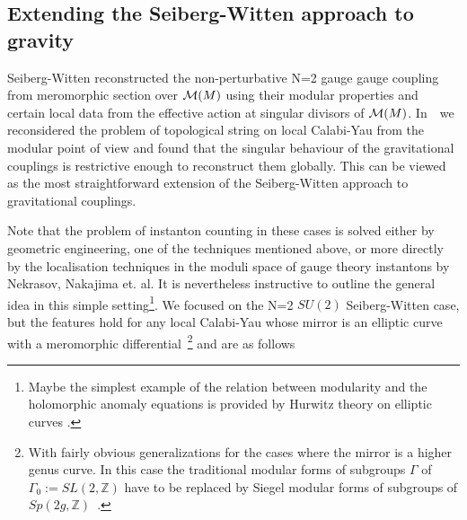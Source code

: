 \documentclass[12pt]{article}
\begin{document}
\subsection{Extending the Seiberg-Witten approach to gravity}
Seiberg-Witten reconstructed the non-perturbative N=2 gauge gauge
coupling from meromorphic section over ${\cal M}(M)$ using their
modular properties and certain local  data from the effective
action at singular divisors of ${\cal M}(M)$. In~\cite{Huang}~we
reconsidered the problem of topological string on local Calabi-Yau
from the modular point of view and found that the singular
behaviour of the gravitational couplings is restrictive enough to
reconstruct them globally. This can be viewed as the most straightforward 
extension of the  Seiberg-Witten approach to gravitational
couplings.

Note that the problem of instanton counting in these cases is
solved either by geometric engineering, one of the techniques
mentioned above, or more directly by the localisation techniques
in the moduli space of gauge theory instantons by Nekrasov,
Nakajima et. al. It is nevertheless instructive to outline the
general idea in this simple setting\footnote{Maybe the simplest
example of the relation between modularity and the holomorphic
anomaly equations is provided by Hurwitz theory on elliptic curves
\cite{dijkgraafzagier}.}. We focused on the N=2 $SU(2)$
Seiberg-Witten case, but the features hold for any local
Calabi-Yau whose mirror is an elliptic curve with a meromorphic
differential~\cite{Aganagic:2006wq,Huang2}\footnote{With fairly
obvious generalizations for the cases where the mirror is a higher
genus curve. In this case the traditional modular forms of
subgroups $\Gamma$ of $\Gamma_0:=SL(2,\mathbb{Z})$ have to be
replaced by Siegel modular forms of subgroups of
$Sp(2g,\mathbb{Z})$~\cite{Aganagic:2006wq}.} and are as follows
\end{document}
